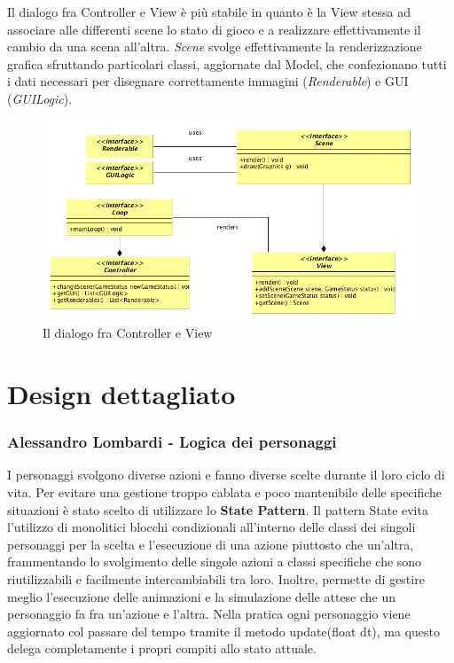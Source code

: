 \documentclass[a4paper,12pt, hidelinks]{report}
\begin{document}
Il dialogo fra Controller e View è più stabile in quanto è la View stessa ad associare alle differenti scene lo stato di gioco e a realizzare effettivamente il cambio da una scena all'altra. \emph{Scene} svolge effettivamente la renderizzazione grafica sfruttando particolari classi, aggiornate dal Model, che confezionano tutti i dati necessari per disegnare correttamente immagini (\emph{Renderable}) e GUI (\emph{GUILogic}).

\begin{figure}[H]
\centering{}
\includegraphics[width=\linewidth]{img/ArchitetturaControllerView}
\caption{Il dialogo fra Controller e View}
\label{img:ControllerView}
\end{figure}

\section{Design dettagliato}

\begin{flushright}
\item\subsubsection{Alessandro Lombardi - Logica dei personaggi}
\end{flushright}

I personaggi svolgono diverse azioni e fanno diverse scelte durante il loro ciclo di vita. Per evitare una gestione troppo cablata e poco mantenibile delle specifiche situazioni è stato scelto di utilizzare lo \textbf{State Pattern}. Il pattern State evita l'utilizzo di monolitici  blocchi condizionali all'interno delle classi dei singoli personaggi per la scelta e l’esecuzione di una azione piuttosto che un’altra, frammentando lo svolgimento delle singole azioni a classi specifiche che sono riutilizzabili e facilmente intercambiabili tra loro. Inoltre, permette di gestire meglio l'esecuzione delle animazioni e la simulazione delle attese che un personaggio fa fra un'azione e l'altra. Nella pratica ogni personaggio viene aggiornato col passare del tempo tramite il metodo update(float dt), ma questo delega completamente i propri compiti allo stato attuale.
\end{document}
